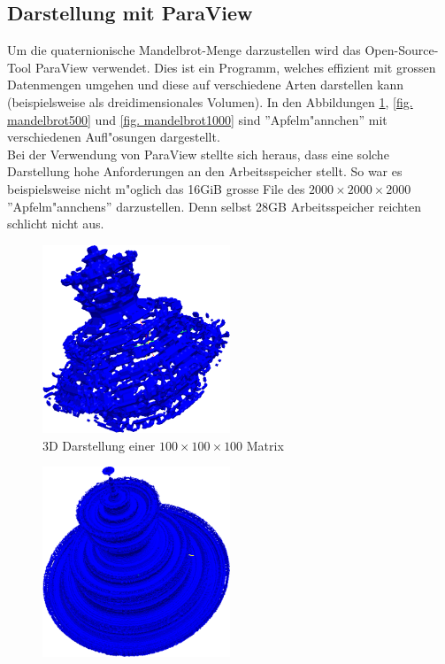 \begin{refsection}
	\subsection{Darstellung mit ParaView}
		Um die quaternionische Mandelbrot-Menge darzustellen wird das Open-Source-Tool ParaView verwendet. Dies ist ein Programm, welches effizient mit grossen Datenmengen umgehen und diese auf verschiedene Arten darstellen kann (beispielsweise als dreidimensionales Volumen). In den Abbildungen \ref{fig. mandelbrot100}, \ref{fig. mandelbrot500} und \ref{fig. mandelbrot1000} sind ''Apfelm"annchen'' mit verschiedenen Aufl"osungen dargestellt.\\[0.3cm] 
		Bei der Verwendung von ParaView stellte sich heraus, dass eine solche Darstellung hohe Anforderungen an den Arbeitsspeicher stellt. So war es beispielsweise nicht m"oglich das 16GiB grosse File des $2000\times2000\times 2000$ ''Apfelm"annchens'' darzustellen. Denn selbst 28GB Arbeitsspeicher reichten schlicht nicht aus.
		\begin{figure}[ht!]\centering
			\includegraphics[width=0.5\textwidth]{apfel/pic/v1_100.png}
			\caption{3D Darstellung einer $100\times100\times 100$ Matrix}
			\label{fig. mandelbrot100}
		\end{figure}
		\begin{figure}[ht!]\centering
			\includegraphics[width=0.5\textwidth]{apfel/pic/v2_500.png}

\end{figure}
\end{refsection}
